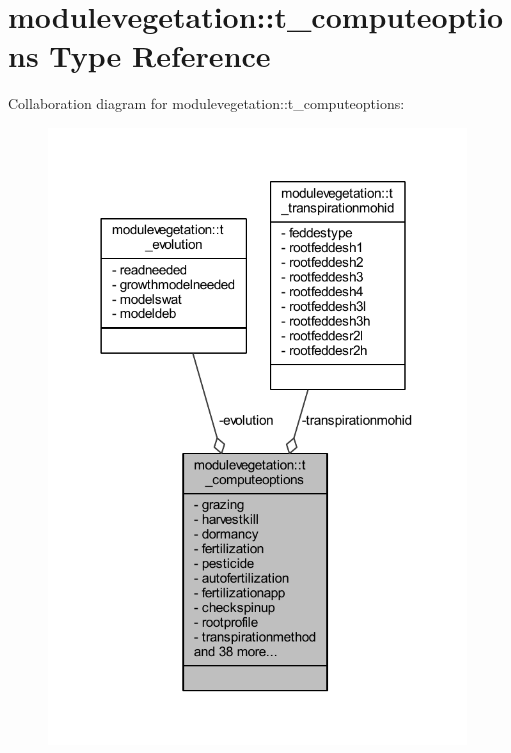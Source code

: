 \hypertarget{structmodulevegetation_1_1t__computeoptions}{}\section{modulevegetation\+:\+:t\+\_\+computeoptions Type Reference}
\label{structmodulevegetation_1_1t__computeoptions}


Collaboration diagram for modulevegetation\+:\+:t\+\_\+computeoptions\+:\nopagebreak
\begin{figure}[H]
\begin{center}
\leavevmode
\includegraphics[width=314pt]{structmodulevegetation_1_1t__computeoptions__coll__graph}
\end{center}
\end{figure}
